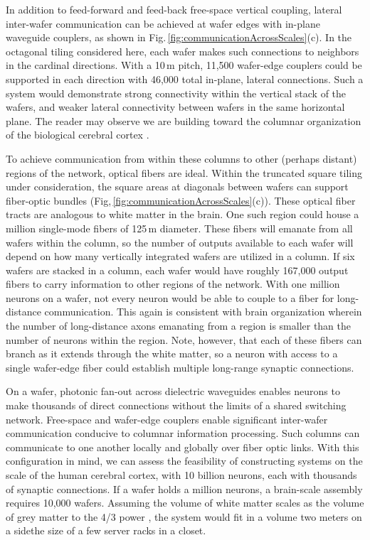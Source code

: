 \documentclass[twocolumn]{article}
\begin{document}
In addition to feed-forward and feed-back free-space vertical coupling, lateral inter-wafer communication can be achieved at wafer edges with in-plane waveguide couplers, as shown in Fig.\,\ref{fig:communicationAcrossScales}(c). In the octagonal tiling considered here, each wafer makes such connections to neighbors in the cardinal directions. With a 10\,\textmu m pitch, 11,500 wafer-edge couplers could be supported in each direction with 46,000 total in-plane, lateral connections. Such a system would demonstrate strong connectivity within the vertical stack of the wafers, and weaker lateral connectivity between wafers in the same horizontal plane. The reader may observe we are building toward the columnar organization of the biological cerebral cortex \cite{mo1997}.

To achieve communication from within these columns to other (perhaps distant) regions of the network, optical fibers are ideal. Within the truncated square tiling under consideration, the square areas at diagonals between wafers can support fiber-optic bundles (Fig,\,\ref{fig:communicationAcrossScales}(c)). These optical fiber tracts are analogous to white matter in the brain. One such region could house a million single-mode fibers of 125\,\textmu m diameter. These fibers will emanate from all wafers within the column, so the number of outputs available to each wafer will depend on how many vertically integrated wafers are utilized in a column. If six wafers are stacked in a column, each wafer would have roughly 167,000 output fibers to carry information to other regions of the network. With one million neurons on a wafer, not every neuron would be able to couple to a fiber for long-distance communication. This again is consistent with brain organization wherein the number of long-distance axons emanating from a region is smaller than the number of neurons within the region. Note, however, that each of these fibers can branch as it extends through the white matter, so a neuron with access to a single wafer-edge fiber could establish multiple long-range synaptic connections. 

On a wafer, photonic fan-out across dielectric waveguides enables neurons to make thousands of direct connections without the limits of a shared switching network. Free-space and wafer-edge couplers enable significant inter-wafer communication conducive to columnar information processing. Such columns can communicate to one another locally and globally over fiber optic links. With this configuration in mind, we can assess the feasibility of constructing systems on the scale of the human cerebral cortex, with 10 billion neurons, each with thousands of synaptic connections. If a wafer holds a million neurons, a brain-scale assembly requires 10,000 wafers. Assuming the volume of white matter scales as the volume of grey matter to the 4/3 power \cite{zhse2000}, the system would fit in a volume two meters on a side\textemdash the size of a few server racks in a closet. 
\end{document}
